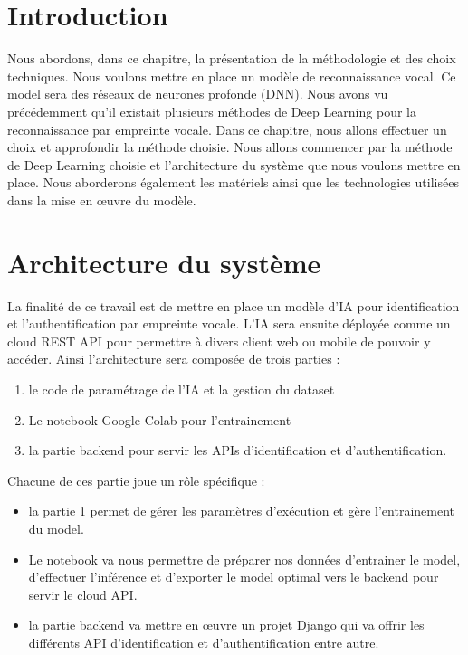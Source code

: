 \section*{Introduction}
Nous abordons, dans ce chapitre, la présentation de la méthodologie et des choix techniques. Nous voulons mettre en place un modèle de reconnaissance vocal. Ce model sera des réseaux de neurones profonde (DNN). Nous avons vu précédemment qu’il existait plusieurs méthodes de Deep Learning pour la reconnaissance par empreinte vocale. Dans ce chapitre, nous allons effectuer un choix et approfondir la méthode choisie. Nous allons commencer par la méthode de Deep Learning choisie et l’architecture du système que nous voulons mettre en place. Nous aborderons également les matériels ainsi que les technologies utilisées dans la mise en œuvre du modèle. 

\section{Architecture du système}
La finalité de ce travail est de mettre en place un modèle d’IA pour identification et l’authentification par empreinte vocale. L’IA sera ensuite déployée comme un cloud REST API pour permettre à divers client web ou mobile de pouvoir y accéder.  Ainsi l’architecture sera composée de trois parties : 
\begin{enumerate}
    \item le code de paramétrage de l’IA et la gestion du dataset
    \item Le notebook Google Colab pour l’entrainement 
    \item la partie backend pour servir les APIs d’identification et d’authentification. 
\end{enumerate}
Chacune de ces partie joue un rôle spécifique : 
\begin{itemize}
    \item la partie 1 permet de gérer les paramètres d’exécution et gère l’entrainement du model. 
    \item Le notebook va nous permettre de préparer nos données d’entrainer le model, d’effectuer l’inférence et d’exporter le model optimal vers le backend pour servir le cloud API. 
    \item la partie backend va mettre en œuvre un projet Django qui va offrir les différents API d’identification et d’authentification entre autre. 
\end{itemize}

